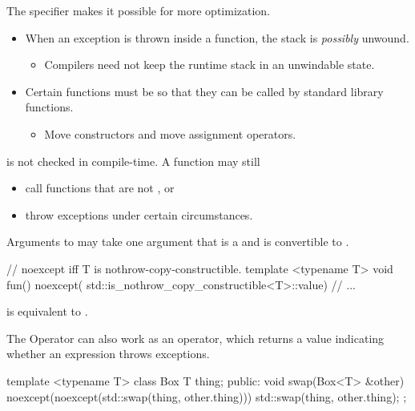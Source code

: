 \documentclass{beamer}
\begin{document}
\begin{frame}{}
  The  specifier makes it possible for more optimization.
  \begin{itemize}
    \item When an exception is thrown inside a  function, the stack is \textit{possibly} unwound.
    \begin{itemize}
      \item Compilers need not keep the runtime stack in an unwindable state.
    \end{itemize}
    \item Certain functions must be  so that they can be called by standard library functions.
    \begin{itemize}
      \item Move constructors and move assignment operators.
    \end{itemize}
  \end{itemize}
\end{frame}

\begin{frame}{}
   is not checked in compile-time. A  function may still
  \begin{itemize}
    \item call functions that are not , or
    \item throw exceptions under certain circumstances.
  \end{itemize}
\end{frame}

\begin{frame}[fragile]{Arguments to }
   may take one argument that is a  and is convertible to .
  \begin{cpp}
// noexcept iff T is nothrow-copy-constructible.
template <typename T>
void fun() noexcept(
    std::is_nothrow_copy_constructible<T>::value) {
  // ...
}
  \end{cpp}
   is equivalent to \ttt{(}\ttt{)}.
\end{frame}

\begin{frame}[fragile]{The  Operator}
   can also work as an operator, which returns a  value indicating whether an expression throws exceptions.
  \begin{cpp}
template <typename T>
class Box {
  T thing;
 public:
  void swap(Box<T> &other)
      noexcept(noexcept(std::swap(thing, other.thing)))
  {
    std::swap(thing, other.thing);
  }
};
  \end{cpp}
\end{frame}
\end{document}
